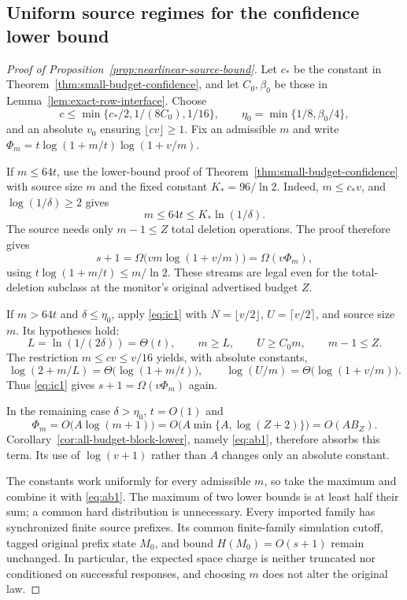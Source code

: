 \documentclass[11pt,letterpaper]{article}
\numberwithin{equation}{section}
\begin{document}
\subsection{Uniform source regimes for the confidence lower bound}
\label{app:source-regimes-proof}

\begin{proof}[Proof of Proposition~\ref{prop:nearlinear-source-bound}]
Let $c_*$ be the constant in Theorem~\ref{thm:small-budget-confidence}, and let $C_0,\beta_0$ be those in Lemma~\ref{lem:exact-row-interface}.
Choose
\[
 c\le\min\{c_*/2,1/(8C_0),1/16\},\qquad
 \eta_0=\min\{1/8,\beta_0/4\},
\]
and an absolute $v_0$ ensuring $\lfloor cv\rfloor\ge1$.
Fix an admissible $m$ and write $\Phi_m=t\log(1+m/t)\log(1+v/m)$.

If $m\le64t$, use the lower-bound proof of Theorem~\ref{thm:small-budget-confidence} with source size $m$ and the fixed constant $K_*=96/\ln2$.
Indeed, $m\le c_*v$, and $\log(1/\delta)\ge2$ gives
\[
 m\le64t\le K_*\ln(1/\delta).
\]
The source needs only $m-1\le Z$ total deletion operations.
The proof therefore gives
\[
 s+1=\Omega\bigl(vm\log(1+v/m)\bigr)
     =\Omega(v\Phi_m),
\]
using $t\log(1+m/t)\le m/\ln2$.
These streams are legal even for the total-deletion subclass at the monitor's original advertised budget $Z$.

If $m>64t$ and $\delta\le\eta_0$, apply \eqref{eq:ic1} with $N=\lfloor v/2\rfloor$, $U=\lceil v/2\rceil$, and source size $m$.
Its hypotheses hold:
\[
 L=\ln(1/(2\delta))=\Theta(t),\qquad
 m\ge L,\qquad U\ge C_0m,\qquad m-1\le Z.
\]
The restriction $m\le cv\le v/16$ yields, with absolute constants,
\[
 \log(2+m/L)=\Theta\bigl(\log(1+m/t)\bigr),\qquad
 \log(U/m)=\Theta\bigl(\log(1+v/m)\bigr).
\]
Thus \eqref{eq:ic1} gives $s+1=\Omega(v\Phi_m)$ again.

In the remaining case $\delta>\eta_0$, $t=O(1)$ and
\[
 \Phi_m=O\bigl(A\log(m+1)\bigr)
       =O\bigl(A\min\{A,\log(Z+2)\}\bigr)
       =O(AB_Z).
\]
Corollary~\ref{cor:all-budget-block-lower}, namely \eqref{eq:ab1}, therefore absorbs this term.
Its use of $\log(v+1)$ rather than $A$ changes only an absolute constant.

The constants work uniformly for every admissible $m$, so take the maximum and combine it with \eqref{eq:ab1}.
The maximum of two lower bounds is at least half their sum; a common hard distribution is unnecessary.
Every imported family has synchronized finite source prefixes.
Its common finite-family simulation cutoff, tagged original prefix state $M_0$, and bound $H(M_0)=O(s+1)$ remain unchanged.
In particular, the expected space charge is neither truncated nor conditioned on successful responses, and choosing $m$ does not alter the original law.
\end{proof}
\end{document}
